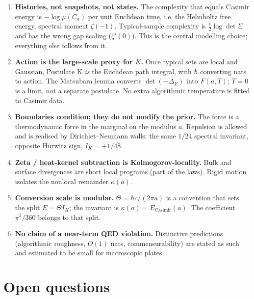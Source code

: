 \documentclass[11pt,letterpaper]{article}
\begin{document}
\begin{enumerate}
\item \textbf{Histories, not snapshots, not states.} The complexity that equals Casimir energy is \(-\log\mu(C_a)\) per unit Euclidean time, i.e. the Helmholtz free energy, spectral moment \(\zeta(-1)\). Typical-sample complexity is \(\tfrac12\log\det\Sigma\) and has the wrong gap scaling (\(\zeta'(0)\)). This is the central modelling choice; everything else follows from it.
\item \textbf{Action is the large-scale proxy for \(K\).} Once typical sets are local and Gaussian, Postulate K \emph{is} the Euclidean path integral, with \(\hbar\) converting nats to action. The Matsubara lemma converts \(\det(-\Delta_E)\) into \(F(a,T)\); \(T=0\) is a limit, not a separate postulate. No extra algorithmic temperature is fitted to Casimir data.
\item \textbf{Boundaries condition; they do not modify the prior.} The force is a thermodynamic force in the marginal on the modulus \(a\). Repulsion is allowed and is realised by Dirichlet–Neumann walls: the same \(1/24\) spectral invariant, opposite Hurwitz sign, \(I_K=+1/48\).
\item \textbf{Zeta / heat-kernel subtraction is Kolmogorov-locality.} Bulk and surface divergences are short local programs (part of the laws). Rigid motion isolates the nonlocal remainder \(\kappa(a)\).
\item \textbf{Conversion scale is modular.} \(\Theta=\hbar c/(2\pi a)\) is a convention that sets the split \(E=\Theta I_K\); the invariant is \(\kappa(a)=E_{\mathrm{Casimir}}(a)\). The coefficient \(\pi^{3}/360\) belongs to that split.
\item \textbf{No claim of a near-term QED violation.} Distinctive predictions (algorithmic roughness, \(O(1)\) nats, commensurability) are stated as such and estimated to be small for macroscopic plates.
\end{enumerate}



\section*{Open questions}
\end{document}
